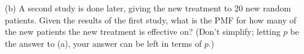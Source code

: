 \documentclass{article}
\begin{document}
(b) A second study is done later, giving the new treatment to 20 new random patients. Given the results of the first study, what is the PMF for how many of the new patients the new treatment is effective on?  (Don’t simplify; letting $p$ be the answer to (a), your answer can be left in terms of $p$.)

\end{document}
